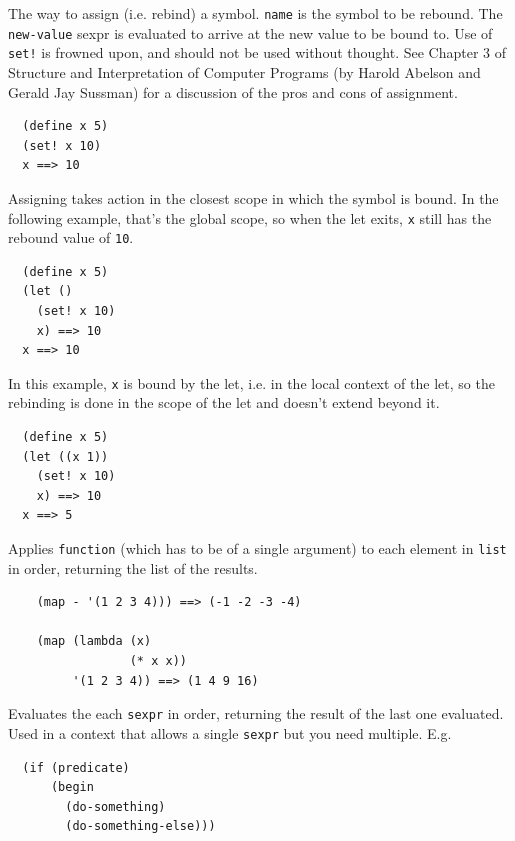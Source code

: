 \documentclass[12pt]{article}
\begin{document}

The way to assign (i.e. rebind) a symbol. \verb|name| is the symbol to be rebound. The \verb|new-value| sexpr is
evaluated to arrive at the new value to be bound to. Use of
\verb|set!| is frowned upon, and should not be used without thought.
See Chapter 3 of Structure and Interpretation of Computer Programs (by
Harold Abelson and Gerald Jay Sussman) for a discussion of the pros
and cons of assignment.

\begin{verbatim}
  (define x 5)
  (set! x 10)
  x ==> 10
\end{verbatim}

Assigning takes action in the closest scope in which the symbol is
bound. In the following example, that's the global scope, so when the
let exits, \verb|x| still has the rebound value of \verb|10|.

\begin{verbatim}
  (define x 5)
  (let ()
    (set! x 10)
    x) ==> 10
  x ==> 10
\end{verbatim}

In this example, \verb|x| is bound by the let, i.e. in the local
context of the let, so the rebinding is done in the scope of the let
and doesn't extend beyond it.

\begin{verbatim}
  (define x 5)
  (let ((x 1))
    (set! x 10)
    x) ==> 10
  x ==> 5
\end{verbatim}


Applies \verb|function| (which has to be of a single argument) to each
element in \verb|list| in order, returning the list of the results. 

\begin{verbatim}
    (map - '(1 2 3 4))) ==> (-1 -2 -3 -4)

    (map (lambda (x)
                 (* x x))
         '(1 2 3 4)) ==> (1 4 9 16)
\end{verbatim}


Evaluates the each \verb|sexpr| in order, returning the result of the
last one evaluated. Used in a context that allows a single
\verb|sexpr| but you need multiple. E.g.

\begin{verbatim}
  (if (predicate)
      (begin
        (do-something)
        (do-something-else)))
\end{verbatim}
\end{document}
